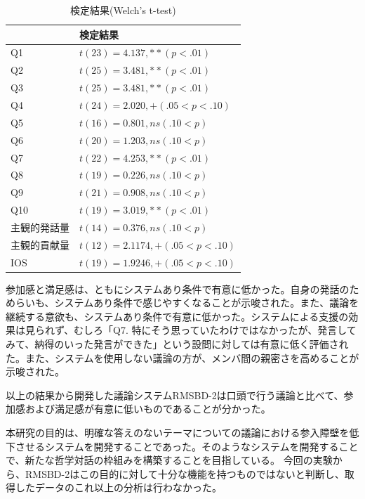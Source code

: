 \documentclass[11pt, a4paper]{jreport} %
\begin{document}
\begin{table}[]
\caption{検定結果(Welch's t-test)}
\centering
\label{tab:jikken2_kente}
\begin{tabular}{@{}ll@{}}
\toprule
\multicolumn{1}{c}{} & 検定結果                                 \\ \midrule
Q1                   & $t(23)= 4.137 ,    ** (p<.01)$     \\
Q2                   & $t(25)= 3.481 ,    ** (p<.01)$      \\
Q3                   & $t(25)= 3.481 ,    ** (p<.01)$      \\
Q4                   & $t(24)= 2.020 ,    +  (.05<p<.10)$ \\
Q5                   & $t(16)= 0.801 ,    ns (.10<p)$     \\
Q6                   & $t(20)= 1.203 ,    ns (.10<p)$      \\
Q7                   & $t(22)= 4.253 ,    ** (p<.01)$     \\
Q8                   & $t(19)= 0.226 ,    ns (.10<p)$     \\
Q9                   & $t(21)= 0.908 ,    ns (.10<p)$     \\
Q10                  & $t(19)= 3.019 ,    ** (p<.01)$      \\
主観的発話量               & $t(14)= 0.376 ,    ns (.10<p)$      \\
主観的貢献量               & $t(12)= 2.1174 ,    +  (.05<p<.10)$ \\
IOS                  & $t(19)= 1.9246 ,    +  (.05<p<.10)$ \\ \bottomrule
\end{tabular}
\end{table}


参加感と満足感は、ともにシステムあり条件で有意に低かった。自身の発話のためらいも、システムあり条件で感じやすくなることが示唆された。また、議論を継続する意欲も、システムあり条件で有意に低かった。システムによる支援の効果は見られず、むしろ「Q7. 特にそう思っていたわけではなかったが、発言してみて、納得のいった発言ができた」という設問に対しては有意に低く評価された。また、システムを使用しない議論の方が、メンバ間の親密さを高めることが示唆された。


以上の結果から開発した議論システムRMSBD-2は口頭で行う議論と比べて、参加感および満足感が有意に低いものであることが分かった。


本研究の目的は、明確な答えのないテーマについての議論における参入障壁を低下させるシステムを開発することであった。そのようなシステムを開発することで、新たな哲学対話の枠組みを構築することを目指している。%
今回の実験から、RMSBD-2はこの目的に対して十分な機能を持つものではないと判断し、取得したデータのこれ以上の分析は行わなかった。%
\end{document}
